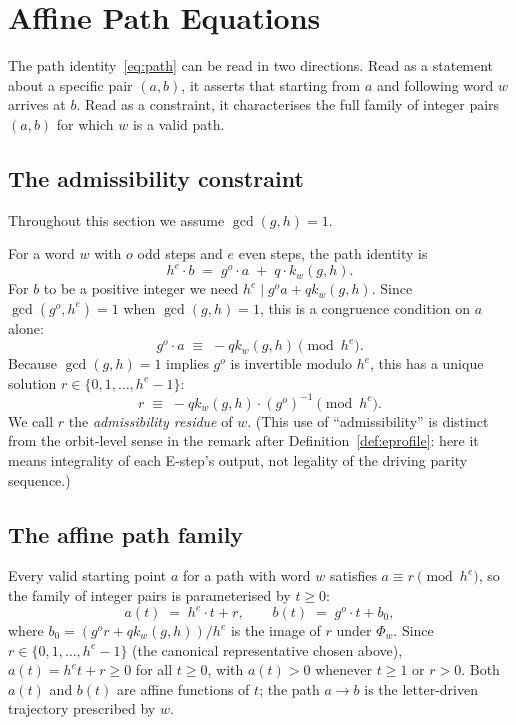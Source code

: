 \documentclass[12pt]{article}
\theoremstyle{definition}
\theoremstyle{remark}
\newcommand{\kpoly}{k}
\begin{document}
\section{Affine Path Equations}
\label{sec:affine-paths}

The path identity~\eqref{eq:path} can be read in two directions.  Read
as a statement about a specific pair $(a,b)$, it asserts that starting
from $a$ and following word $w$ arrives at $b$.  Read as a constraint,
it characterises the full family of integer pairs $(a,b)$ for which $w$
is a valid path.

\subsection{The admissibility constraint}

Throughout this section we assume $\gcd(g,h) = 1$.

For a word $w$ with $o$ odd steps and $e$ even steps, the path identity is
\[
  h^e \cdot b \;=\; g^o \cdot a \;+\; q \cdot \kpoly_w(g,h).
\]
For $b$ to be a positive integer we need $h^e \mid g^o a + q\kpoly_w(g,h)$.
Since $\gcd(g^o, h^e) = 1$ when $\gcd(g,h)=1$, this is a congruence
condition on $a$ alone:
\[
  g^o \cdot a \;\equiv\; -q\kpoly_w(g,h) \pmod{h^e}.
\]
Because $\gcd(g,h)=1$ implies $g^o$ is invertible modulo $h^e$, this has
a unique solution $r \in \{0, 1, \ldots, h^e - 1\}$:
\[
  r \;\equiv\; -q\kpoly_w(g,h) \cdot (g^o)^{-1} \pmod{h^e}.
\]
We call $r$ the \emph{admissibility residue} of $w$.  (This use of
``admissibility'' is distinct from the orbit-level sense in the remark
after Definition~\ref{def:eprofile}: here it means integrality of each
E-step's output, not legality of the driving parity sequence.)

\subsection{The affine path family}

Every valid starting point $a$ for a path with word $w$ satisfies
$a \equiv r \pmod{h^e}$, so the family of integer pairs is parameterised
by $t \geq 0$:
\begin{equation}
  \label{eq:affine-path}
  a(t) \;=\; h^e \cdot t + r, \qquad
  b(t) \;=\; g^o \cdot t + b_0,
\end{equation}
where $b_0 = (g^o r + q\kpoly_w(g,h))/h^e$ is the image of $r$ under
$\Phi_w$.  Since $r \in \{0,1,\ldots,h^e-1\}$ (the canonical representative
chosen above), $a(t) = h^e t + r \geq 0$ for all $t \geq 0$, with
$a(t) > 0$ whenever $t \geq 1$ or $r > 0$.  Both $a(t)$ and $b(t)$ are
affine functions of $t$; the path $a \to b$ is the letter-driven
trajectory prescribed by $w$.
\end{document}
